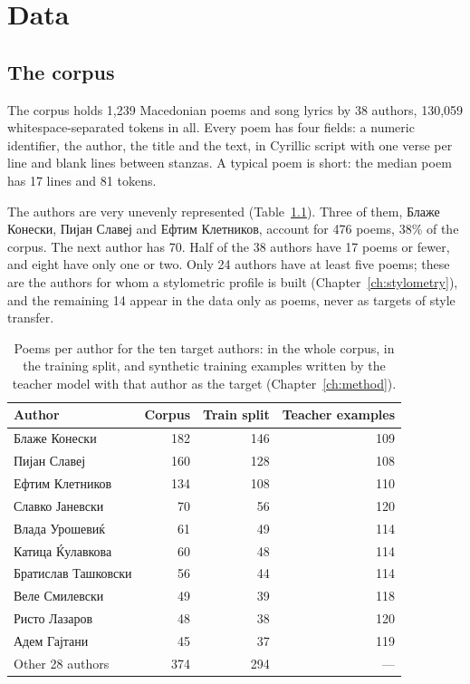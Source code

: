 \chapter{Data}\label{ch:data}

\section{The corpus}

The corpus holds 1,239 Macedonian poems and song lyrics by 38 authors,
130,059 whitespace-separated tokens in all. Every poem has four fields: a
numeric identifier, the author, the title and the text, in Cyrillic script
with one verse per line and blank lines between stanzas. A typical poem is
short: the median poem has 17 lines and 81 tokens.

The authors are very unevenly represented (Table~\ref{tab:authors}). Three
of them, Блаже Конески, Пијан Славеј and Ефтим Клетников, account for 476
poems, 38\% of the corpus. The next author has 70. Half of the 38 authors
have 17 poems or fewer, and eight have only one or two. Only 24 authors have
at least five poems; these are the authors for whom a stylometric profile
is built (Chapter~\ref{ch:stylometry}), and the remaining 14 appear in the
data only as poems, never as targets of style transfer.

\begin{table}[ht]
\centering
\begin{tabular}{lrrr}
\toprule
Author & Corpus & Train split & Teacher examples \\
\midrule
Блаже Конески       & 182 & 146 & 109 \\
Пијан Славеј        & 160 & 128 & 108 \\
Ефтим Клетников     & 134 & 108 & 110 \\
Славко Јаневски     &  70 &  56 & 120 \\
Влада Урошевиќ      &  61 &  49 & 114 \\
Катица Ќулавкова    &  60 &  48 & 114 \\
Братислав Ташковски &  56 &  44 & 114 \\
Веле Смилевски      &  49 &  39 & 118 \\
Ристо Лазаров       &  48 &  38 & 120 \\
Адем Гајтани        &  45 &  37 & 119 \\
\midrule
Other 28 authors    & 374 & 294 & --- \\
\bottomrule
\end{tabular}
\caption{Poems per author for the ten target authors: in the whole corpus,
in the training split, and synthetic training examples written by the
teacher model with that author as the target (Chapter~\ref{ch:method}).}
\label{tab:authors}
\end{table}

